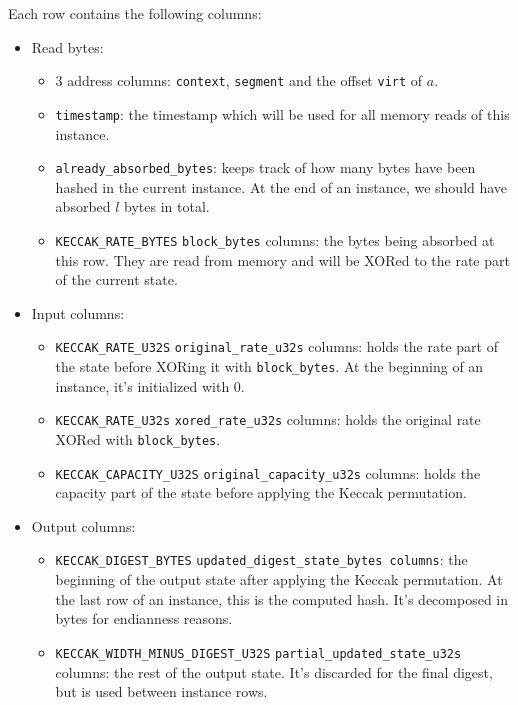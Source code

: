 Each row contains the following columns:
\begin{itemize}
    \item Read bytes:
        \begin{itemize}
            \item 3 address columns: \texttt{context}, \texttt{segment} and the offset \texttt{virt} of $a$.
            \item \texttt{timestamp}: the timestamp which will be used for all memory reads of this instance.
            \item \texttt{already\_absorbed\_bytes}: keeps track of how many bytes have been hashed in the current instance. At the end of an instance, we should have absorbed $l$ bytes in total.
            \item \texttt{KECCAK\_RATE\_BYTES} \texttt{block\_bytes} columns: the bytes being absorbed at this row. They are read from memory and will be XORed to the rate part of the current state.
        \end{itemize}
    \item Input columns:
    \begin{itemize}
        \item \texttt{KECCAK\_RATE\_U32S} \texttt{original\_rate\_u32s} columns: holds the rate part of the state before XORing it with \texttt{block\_bytes}. At the beginning of an instance, it's initialized with 0.
        \item \texttt{KECCAK\_RATE\_U32s} \texttt{xored\_rate\_u32s} columns: holds the original rate XORed with \texttt{block\_bytes}.
        \item \texttt{KECCAK\_CAPACITY\_U32S} \texttt{original\_capacity\_u32s} columns: holds the capacity part of the state before applying the Keccak permutation.
    \end{itemize}
    \item Output columns:
    \begin{itemize}
        \item \texttt{KECCAK\_DIGEST\_BYTES} \texttt{updated\_digest\_state\_bytes columns}: the beginning of the output state after applying the Keccak permutation. At the last row of an instance, this is the computed hash.
It's decomposed in bytes for endianness reasons.
        \item \texttt{KECCAK\_WIDTH\_MINUS\_DIGEST\_U32S} \texttt{partial\_updated\_state\_u32s} columns: the rest of the output state. It's discarded for the final digest, but is used between instance rows.
    \end{itemize}

\end{itemize}
